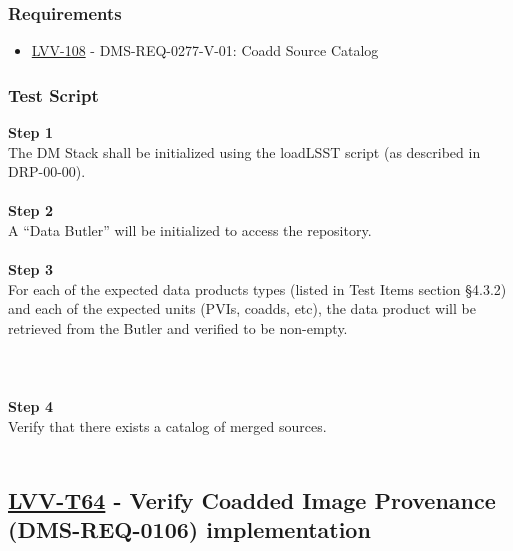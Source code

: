 \hypertarget{requirements-15}{%
\subsubsection{Requirements}\label{requirements-15}}

\begin{itemize}
\tightlist
\item
  \href{https://jira.lsstcorp.org/browse/LVV-108}{LVV-108} -
  DMS-REQ-0277-V-01: Coadd Source Catalog
\end{itemize}

\hypertarget{test-script-7}{%
\subsubsection{Test Script}\label{test-script-7}}

\textbf{Step 1}\\
The DM Stack shall be initialized using the loadLSST script (as
described in DRP-00-00).\\
~\\
\textbf{Step 2}\\
A ``Data Butler'' will be initialized to access the repository.\\
~\\
\textbf{Step 3}\\
For each of the expected data products types (listed in Test Items
section §4.3.2) and each of the expected units (PVIs, coadds, etc), the
data product will be retrieved from the Butler and verified to be
non-empty.\\
~\\
~\\
~\\
\textbf{Step 4}\\
Verify that there exists a catalog of merged sources.\\
~\\

\hypertarget{lvv-t64---verify-coadded-image-provenance-dms-req-0106-implementation}{%
\subsection{\texorpdfstring{\href{https://jira.lsstcorp.org/secure/Tests.jspa\#/testCase/LVV-T64}{LVV-T64}
- Verify Coadded Image Provenance (DMS-REQ-0106)
implementation}{LVV-T64 - Verify Coadded Image Provenance (DMS-REQ-0106) implementation}}\label{lvv-t64---verify-coadded-image-provenance-dms-req-0106-implementation}}

